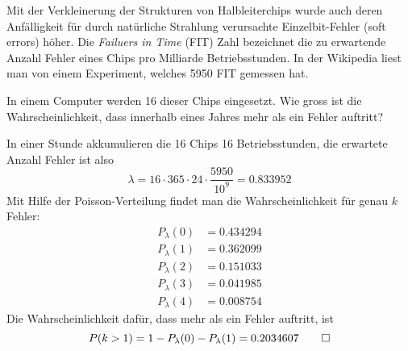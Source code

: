 Mit der Verkleinerung der Strukturen von Halbleiterchips wurde auch deren
Anfälligkeit für durch natürliche Strahlung verursachte Einzelbit-Fehler
(soft errors)
höher.
Die {\em Failuers in Time} (FIT) Zahl bezeichnet die zu erwartende Anzahl
Fehler eines Chips pro Milliarde Betriebsstunden.
In der Wikipedia liest man von einem Experiment, welches 5950 FIT
gemessen hat.

In einem Computer werden 16 dieser Chips eingesetzt.
Wie gross ist die Wahrscheinlichkeit, dass innerhalb eines
Jahres mehr als ein Fehler auftritt?


\begin{loesung}
In einer Stunde akkumulieren die 16 Chips 16 Betriebsstunden, die erwartete
Anzahl Fehler ist also
\[
\lambda = 16\cdot365\cdot 24 \cdot \frac{5950}{10^{9}}=0.833952
\]
Mit Hilfe der Poisson-Verteilung findet man die Wahrscheinlichkeit für
genau $k$ Fehler:
\begin{align*}
P_{\lambda}(0)&=0.434294\\
P_{\lambda}(1)&=0.362099\\
P_{\lambda}(2)&=0.151033\\
P_{\lambda}(3)&=0.041985\\
P_{\lambda}(4)&=0.008754
\end{align*}
Die Wahrscheinlichkeit dafür, dass mehr als ein Fehler auftritt, ist
\[
P(k > 1)=1-P_\lambda(0)-P_\lambda(1)=0.2034607
\qedhere
\]
\end{loesung}


